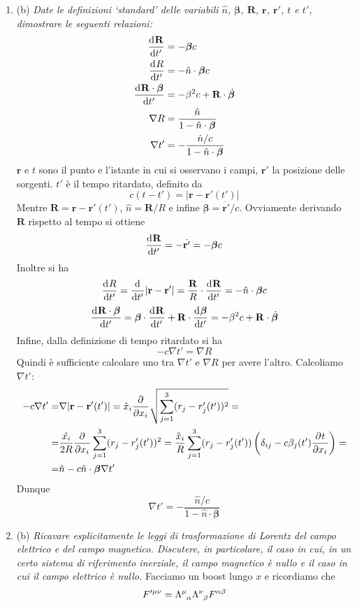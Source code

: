 \documentclass{article}
\renewcommand{\b}{(b)}
\renewcommand{\t}[1]{\textit{ #1}}
\renewcommand{\vec}[1]{\mathbf{#1}}
\begin{document}
\begin{enumerate}
	\item\b\t{Date le definizioni ‘standard’ delle variabili $\hat{n}$, $\bm{\beta}$, $\vec{R}$, $\vec{r}$, $\vec{r}'$, $t$ e $t'$, dimostrare le
		seguenti relazioni: \begin{align*}
		\der{\vec{R}}{t'}&=-\bm{\beta}c\\\der{R}{t'}&=-\hat{n}\cdot\bm{\beta}c\\\der{\vec{R}\cdot\bm{\beta}}{t'}&=-\beta^2c+\vec{R}\cdot\dot{\bm{\beta}}\\\nabla R&=\frac{\hat{n}}{1-\hat{n}\cdot{\bm{\beta}}}\\\nabla t'&=-\frac{\hat{n}/c}{1-\hat{n}\cdot\bm{\beta}}\end{align*}} $\vec{r}$ e $t$ sono il punto e l'istante in cui si osservano i campi, $\vec{r}'$ la posizione delle sorgenti. $t'$ è il tempo ritardato, definito da
	\[c(t-t')=|\vec{r}-\vec{r}'(t')|\]
	Mentre $\vec{R}=\vec{r}-\vec{r}'(t')$, $\hat{n}=\vec{R}/R$ e infine $\bm{\beta}=\dot{\vec{r}'}/c$. Ovviamente derivando $\vec{R}$ rispetto al tempo si ottiene
	\[\der{\vec{R}}{t'}=-\dot{\vec{r}'}=-\bm{\beta}c\]
	Inoltre si ha
	\[\der{R}{t'}=\der{}{t'}|\vec{r}-\vec{r'}|=\frac{\vec{R}}{R}\cdot\der{\vec{R}}{t'}=-\hat{n}\cdot\bm{\beta}c\]\[\der{\vec{R}\cdot\bm{\beta}}{t'}=\bm{\beta}\cdot\der{\vec{R}}{t'}+\vec{R}\cdot\der{\bm{\beta}}{t'}=-\beta^2c+\vec{R}\cdot\dot{\bm{\beta}}\]
	Infine, dalla definizione di tempo ritardato si ha
	\[-c\nabla t'=\nabla R\]
	Quindi è sufficiente calcolare uno tra $\nabla t'$ e $\nabla R$ per avere l'altro. Calcoliamo $\nabla t'$:
	\begin{align*}
		-c\nabla t'=&\nabla|\vec{r}-\vec{r}'(t')|=\hat{x}_i\pder{}{x_i}\sqrt{\sum_{j=1}^{3}(r_j-r'_j(t'))^2}=\\=&\frac{\hat{x_i}}{2R}\pder{}{x_i}\sum_{j=1}^{3}(r_j-r'_j(t'))^2=\frac{\hat{x}_i}{R}\sum_{j=1}^{3}(r_j-r'_j(t'))\left(\delta_{ij}-c\beta_j(t')\pder{t}{x_i}\right)=\\=&\hat{n}-c\hat{n}\cdot\bm{\beta}\nabla t'
	\end{align*}
	Dunque
	\[\nabla t'=-\frac{\hat{n}/c}{1-\hat{n}\cdot\bm{\beta}}\]
	\item\b\t{Ricavare esplicitamente le leggi di trasformazione di Lorentz del campo elettrico
		e del campo magnetico. Discutere, in particolare, il caso in cui, in un certo
		sistema di riferimento inerziale, il campo magnetico è nullo e il caso in cui il
		campo elettrico è nullo.} Facciamo un boost lungo $x$ e ricordiamo che
	\[F'^{\mu\nu}=\tensor{\Lambda}{^\mu_\alpha}\tensor{\Lambda}{^\nu_\beta}F^{\alpha\beta}\]

\end{enumerate}
\end{document}
